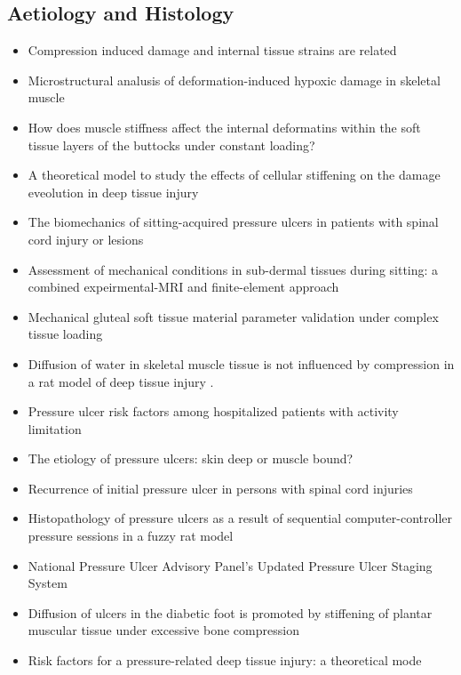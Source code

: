 		\subsection{Aetiology and Histology}
			\begin{itemize}
				\item Compression induced damage and internal tissue strains are related \cite{ceelen08}
				\item Microstructural analusis of deformation-induced hypoxic damage in skeletal muscle \cite{ceelen08-8}
				\item How does muscle stiffness affect the internal deformatins within the soft tissue layers of the buttocks under constant loading? \cite{loerakker13}
				\item A theoretical model to study the effects of cellular stiffening on the damage eveolution in deep tissue injury \cite{nagel09}
				\item The biomechanics of sitting-acquired pressure ulcers in patients with spinal cord injury or lesions \cite{gefen07-9}
				\item Assessment of mechanical conditions in sub-dermal tissues during sitting: a combined expeirmental-MRI and finite-element approach \cite{linderganz06}
				\item Mechanical gluteal soft tissue material parameter validation under complex tissue loading \cite{then09}
				\item Diffusion of water in skeletal muscle tissue is not influenced by compression in a rat model of deep tissue injury \cite{vanNierop10}.
				\item Pressure ulcer risk factors among hospitalized patients with activity limitation \cite{allman95}
				\item The etiology of pressure ulcers: skin deep or muscle bound? \cite{bouten03}
				\item Recurrence of initial pressure ulcer in persons with spinal cord injuries \cite{niazi97}
				\item Histopathology of pressure ulcers as a result of sequential computer-controller pressure sessions in a fuzzy rat model \cite{salcido94}
				\item National Pressure Ulcer Advisory Panel's Updated Pressure Ulcer Staging System \cite{black07}
				\item Diffusion of ulcers in the diabetic foot is promoted by stiffening of plantar muscular tissue under excessive bone compression \cite{gefen04}
				\item Risk factors for a pressure-related deep tissue injury: a theoretical mode \cite{gefen07}

\end{itemize}
